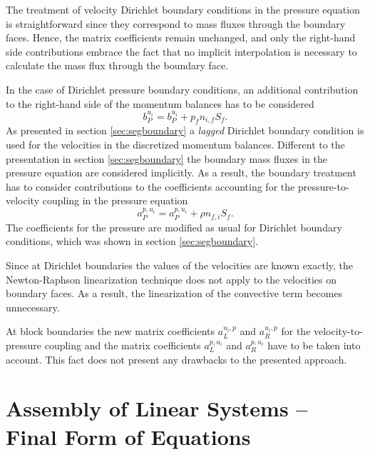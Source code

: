The treatment of velocity Dirichlet boundary conditions in the pressure equation is straightforward since they correspond to mass fluxes through the boundary faces. Hence, the matrix coefficients remain unchanged, and only the right-hand side contributions embrace the fact that no implicit interpolation is necessary to calculate the mass flux through the boundary face.

In the case of Dirichlet pressure boundary conditions, an additional contribution to the right-hand side of the momentum balances has to be considered
\begin{displaymath}
  b_P^{u_i} = b_P^{u_i} + p_f n_{i,f} S_f.
\end{displaymath}
As presented in section \ref{sec:segboundary} a \emph{lagged} Dirichlet boundary condition is used for the velocities in the discretized momentum balances. Different to the presentation in section \ref{sec:segboundary} the boundary mass fluxes in the pressure equation are considered implicitly. As a result, the boundary treatment has to consider contributions to the coefficients accounting for the pressure-to-velocity coupling in the pressure equation
\begin{displaymath}
  a_P^{p,u_i} = a_P^{p,u_i} + \rho n_{f,i} S_f.
\end{displaymath}
The coefficients for the pressure are modified as usual for Dirichlet boundary conditions, which was shown in section \ref{sec:segboundary}.

Since at Dirichlet boundaries the values of the velocities are known exactly, the Newton-Raphson linearization technique does not apply to the velocities on boundary faces. As a result, the linearization of the convective term becomes unnecessary.

At block boundaries the new matrix coefficients \(a_L^{u_i,p}\) and \(a_R^{u_i,p}\) for the velocity-to-pressure coupling and the matrix coefficients \(a_L^{p,u_i}\) and \(a_R^{p,u_i}\) have to be taken into account. This fact does not present any drawbacks to the presented approach.

\section{Assembly of Linear Systems -- Final Form of Equations}
\label{sec:cpldassembly}

